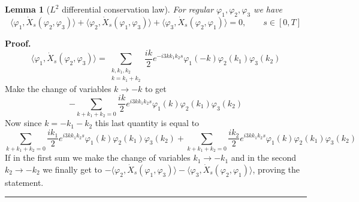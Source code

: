 \documentclass[a4paper,11pt,reqno]{article}
\newtheorem{lemma}[theorem]{Lemma}
\newenvironment{proof}[1][Proof]{\textbf{#1.} }{\ \rule{0.5em}{0.5em}}
\begin{document}
\begin{lemma}[$L^2$ differential conservation law]
For regular $\varphi_1,\varphi_2,\varphi_3$ we have
\label{lemma:basic-symmetry}
$$
\langle \varphi_1, \dot X_s(\varphi_2,\varphi_3)\rangle 
+\langle \varphi_2, \dot X_s(\varphi_1,\varphi_3)\rangle 
+\langle \varphi_3, \dot X_s(\varphi_2,\varphi_1)\rangle 
= 0, \qquad s \in[0,T]
$$  
\end{lemma}
\begin{proof}
  \begin{equation}
    \label{eq:cons-1}
\langle \varphi_1, \dot X_s(\varphi_2,\varphi_3)\rangle  =
\sum_{\substack{k,k_1,k_2\\ k=k_1+k_2}} \frac{ik}{2}e^{-i3k k_1 k_2
  s}  \varphi_{1}(-k)  \varphi_2(k_1) \varphi_3(k_2)
  \end{equation}
Make the change of variables $k \to -k$ to get
$$
- \sum_{k+k_1+k_2=0} \frac{ik}{2}e^{i3k k_1 k_2
  s}  \varphi_{1}(k)  \varphi_2(k_1) \varphi_3(k_2)
$$
Now since $k = -k_1-k_2$ this last quantity is equal to
$$
 \sum_{k+k_1+k_2=0} \frac{ik_1}{2}e^{i3k k_1 k_2
  s}  \varphi_{1}(k)  \varphi_2(k_1) \varphi_3(k_2)
+ \sum_{k+k_1+k_2=0} \frac{ik_2}{2}e^{i3k k_1 k_2
  s}  \varphi_{1}(k)  \varphi_2(k_1) \varphi_3(k_2)
$$
If 
in the first sum we make the change of variables $k_1 \to -k_1$ and in
the second $k_2 \to -k_2$ we finally get to
$
- \langle \varphi_2, \dot X_s(\varphi_1,\varphi_3)\rangle - \langle \varphi_3, \dot X_s(\varphi_2,\varphi_1)\rangle
$,
proving the statement.
\end{proof}
\end{document}

